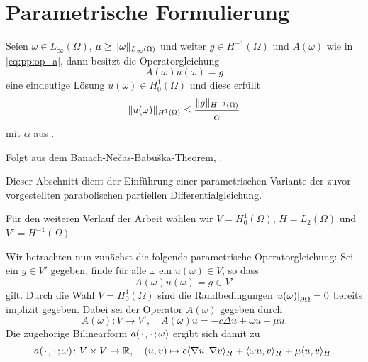 

\section{Parametrische Formulierung} %
\label{sec:parametrische_formulierung}

\begin{Satz}
\label{satz:pp:lax_auf_elliptisch}
    Seien $\omega \in L_{\infty}(\Omega)$, $\mu \geq \lVert\omega\rVert_{L_{\infty}(\Omega)}$ und weiter $g \in H^{-1}(\Omega)$ und $A(\omega)$ wie in \eqref{eq:pp:op_a}, dann besitzt die Operatorgleichung
    \begin{equation}
        A(\omega) u(\omega) = g
    \end{equation}
    eine eindeutige Lösung $u(\omega) \in H^{1}_{0}(\Omega)$ und diese erfüllt
    \begin{equation}
        \lVert u(\omega)\rVert_{H^{1}(\Omega)} \leq \frac{\lVert g\rVert_{H^{-1}(\Omega)}}{\alpha}
    \end{equation}
    mit $\alpha$ aus .

    \begin{Beweis}
        Folgt aus dem Banach-Ne\v{c}as-Babu\v{s}ka-Theorem, .
    \end{Beweis}
\end{Satz}



Dieser Abschnitt dient der Einführung einer parametrischen Variante der zuvor vorgestellten parabolischen partiellen Differentialgleichung.

Für den weiteren Verlauf der Arbeit wählen wir $V = H^{1}_{0}(\Omega)$, $H = L_{2}(\Omega)$ und $V' = H^{-1}(\Omega)$.

Wir betrachten nun zunächst die folgende parametrische Operatorgleichung: Sei ein $g \in V'$ gegeben, finde für alle $\omega$ ein $u(\omega) \in V$, so dass
\begin{equation}
    A(\omega) u(\omega) = g \in V'
\end{equation}
gilt.
Durch die Wahl $V = H^{1}_{0}(\Omega)$ sind die Randbedingungen $\left.u(\omega)\right|_{\partial \Omega} = 0$ bereits implizit gegeben.
Dabei sei der Operator $A(\omega)$ gegeben durch
\begin{equation}
    \label{eq:pp:op_a}
    A(\omega) \colon V \to V', \quad A(\omega) u = - c \Delta u + \omega u + \mu u.
\end{equation}
Die zugehörige Bilinearform $a({\mkern2mu\cdot\mkern2mu}, {\mkern2mu\cdot\mkern2mu}; \omega)$ ergibt sich damit zu
\begin{equation}
    \label{eq:pp:bf_a}
    a({\mkern2mu\cdot\mkern2mu}, {\mkern2mu\cdot\mkern2mu}; \omega) \colon V \times V \to \mathbb{R},
    \quad (u, v) \mapsto c\langle\nabla u,\nabla v\rangle_{H} + \langle\omega u,v\rangle_{H} + \mu \langle u,v\rangle_{H}.
\end{equation}

